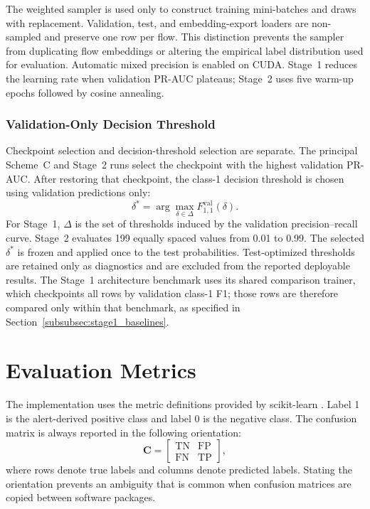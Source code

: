 \documentclass[11pt,fleqn]{report}
\begin{document}
The weighted sampler is used only to construct training mini-batches and draws
with replacement. Validation, test, and embedding-export loaders are
non-sampled and preserve one row per flow. This distinction prevents the
sampler from duplicating flow embeddings or altering the empirical label
distribution used for evaluation. Automatic mixed precision is enabled on
CUDA. Stage~1 reduces the learning rate when validation PR-AUC plateaus;
Stage~2 uses five warm-up epochs followed by cosine annealing.

\subsubsection{Validation-Only Decision Threshold}
\label{subsubsec:experimental_thresholding}

Checkpoint selection and decision-threshold selection are separate. The
principal Scheme~C and Stage~2 runs select the checkpoint with the highest
validation PR-AUC. After restoring that checkpoint, the class-1 decision
threshold is chosen using validation predictions only:
\begin{equation}
    \delta^{*}
    =\arg\max_{\delta\in\Delta}
      F_{1,1}^{\mathrm{val}}(\delta).
    \label{eq:validation_threshold_selection}
\end{equation}
For Stage~1, $\Delta$ is the set of thresholds induced by the validation
precision--recall curve. Stage~2 evaluates 199 equally spaced values from 0.01
to 0.99. The selected $\delta^{*}$ is frozen and applied once to the test
probabilities. Test-optimized thresholds are retained only as diagnostics and
are excluded from the reported deployable results. The Stage~1 architecture
benchmark uses its shared comparison trainer, which checkpoints all rows by
validation class-1 F1; those rows are therefore compared only within that
benchmark, as specified in Section~\ref{subsubsec:stage1_baselines}.

\section{Evaluation Metrics}
\label{subsec:experimental_metrics}

The implementation uses the metric definitions provided by scikit-learn
\cite{Pedregosa2011ScikitLearn}. Label 1 is the alert-derived positive class and
label 0 is the negative class. The confusion matrix is always reported in the
following orientation:
\begin{equation}
    \mathbf{C}=
    \begin{bmatrix}
        \mathrm{TN} & \mathrm{FP}\\
        \mathrm{FN} & \mathrm{TP}
    \end{bmatrix},
    \label{eq:experimental_confusion_matrix}
\end{equation}
where rows denote true labels and columns denote predicted labels. Stating the
orientation prevents an ambiguity that is common when confusion matrices are
copied between software packages.
\end{document}
